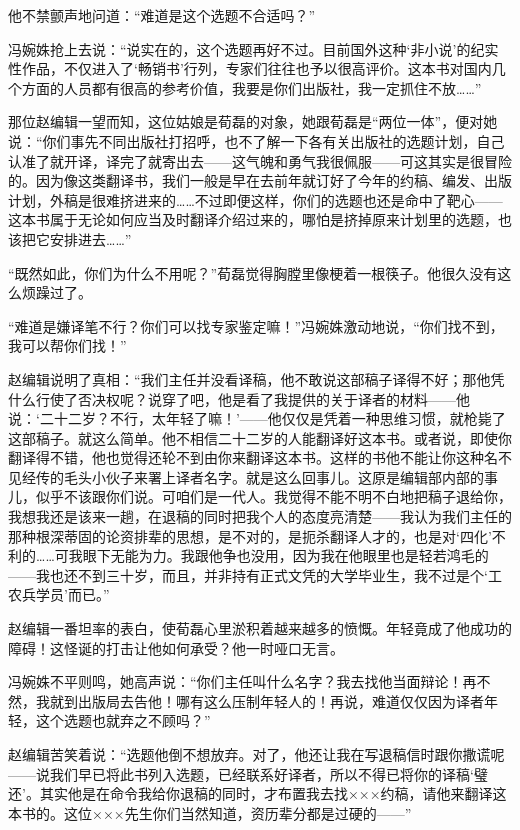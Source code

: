\par 他不禁颤声地问道：“难道是这个选题不合适吗？”
\par 冯婉姝抢上去说：“说实在的，这个选题再好不过。目前国外这种‘非小说’的纪实性作品，不仅进入了‘畅销书’行列，专家们往往也予以很高评价。这本书对国内几个方面的人员都有很高的参考价值，我要是你们出版社，我一定抓住不放……”
\par 那位赵编辑一望而知，这位姑娘是荀磊的对象，她跟荀磊是“两位一体”，便对她说：“你们事先不同出版社打招呼，也不了解一下各有关出版社的选题计划，自己认准了就开译，译完了就寄出去——这气魄和勇气我很佩服——可这其实是很冒险的。因为像这类翻译书，我们一般是早在去前年就订好了今年的约稿、编发、出版计划，外稿是很难挤进来的……不过即便这样，你们的选题也还是命中了靶心——这本书属于无论如何应当及时翻译介绍过来的，哪怕是挤掉原来计划里的选题，也该把它安排进去……”
\par “既然如此，你们为什么不用呢？”荀磊觉得胸膛里像梗着一根筷子。他很久没有这么烦躁过了。
\par “难道是嫌译笔不行？你们可以找专家鉴定嘛！”冯婉姝激动地说，“你们找不到，我可以帮你们找！”
\par 赵编辑说明了真相：“我们主任并没看译稿，他不敢说这部稿子译得不好；那他凭什么行使了否决权呢？说穿了吧，他是看了我提供的关于译者的材料——他说：‘二十二岁？不行，太年轻了嘛！'——他仅仅是凭着一种思维习惯，就枪毙了这部稿子。就这么简单。他不相信二十二岁的人能翻译好这本书。或者说，即使你翻译得不错，他也觉得还轮不到由你来翻译这本书。这样的书他不能让你这种名不见经传的毛头小伙子来署上译者名字。就是这么回事儿。这原是编辑部内部的事儿，似乎不该跟你们说。可咱们是一代人。我觉得不能不明不白地把稿子退给你，我想我还是该来一趟，在退稿的同时把我个人的态度亮清楚——我认为我们主任的那种根深蒂固的论资排辈的思想，是不对的，是扼杀翻译人才的，也是对‘四化’不利的……可我眼下无能为力。我跟他争也没用，因为我在他眼里也是轻若鸿毛的——我也还不到三十岁，而且，并非持有正式文凭的大学毕业生，我不过是个‘工农兵学员’而已。”
\par 赵编辑一番坦率的表白，使荀磊心里淤积着越来越多的愤慨。年轻竟成了他成功的障碍！这怪诞的打击让他如何承受？他一时哑口无言。
\par 冯婉姝不平则鸣，她高声说：“你们主任叫什么名字？我去找他当面辩论！再不然，我就到出版局去告他！哪有这么压制年轻人的！再说，难道仅仅因为译者年轻，这个选题也就弃之不顾吗？”
\par 赵编辑苦笑着说：“选题他倒不想放弃。对了，他还让我在写退稿信时跟你撒谎呢——说我们早已将此书列入选题，已经联系好译者，所以不得已将你的译稿‘璧还’。其实他是在命令我给你退稿的同时，才布置我去找×××约稿，请他来翻译这本书的。这位×××先生你们当然知道，资历辈分都是过硬的——”
